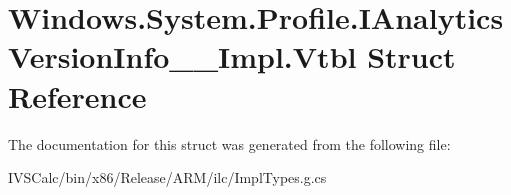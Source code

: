 \hypertarget{struct_windows_1_1_system_1_1_profile_1_1_i_analytics_version_info_____impl_1_1_vtbl}{}\section{Windows.\+System.\+Profile.\+I\+Analytics\+Version\+Info\+\_\+\+\_\+\+Impl.\+Vtbl Struct Reference}
\label{struct_windows_1_1_system_1_1_profile_1_1_i_analytics_version_info_____impl_1_1_vtbl}


The documentation for this struct was generated from the following file\+:\begin{DoxyCompactItemize}
\item 
I\+V\+S\+Calc/bin/x86/\+Release/\+A\+R\+M/ilc/Impl\+Types.\+g.\+cs\end{DoxyCompactItemize}
